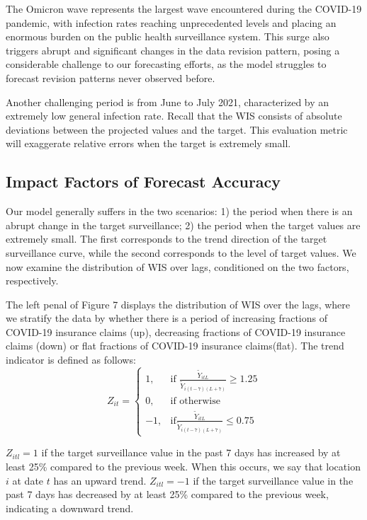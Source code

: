 The Omicron wave represents the largest wave encountered during the COVID-19 pandemic, with infection rates reaching unprecedented levels and placing an enormous burden on the public health surveillance system. This surge also triggers abrupt and significant changes in the data revision pattern, posing a considerable challenge to our forecasting efforts, as the model struggles to forecast revision patterns never observed before.


Another challenging period is from June to July 2021, characterized by an extremely low general infection rate. Recall that the WIS consists of absolute deviations between the projected values and the target. This evaluation metric will exaggerate relative errors when the target is extremely small.


\subsection{Impact Factors of Forecast Accuracy}
Our model generally suffers in the two scenarios: 1) the period when there is an abrupt change in the target surveillance; 2) the period when the target values are extremely small. The first corresponds to the trend direction of the target surveillance curve, while the second corresponds to the level of target values. We now examine the distribution of WIS over lags, conditioned on the two factors, respectively.

The left penal of Figure 7 displays the distribution of WIS over the lags, where we stratify the data by whether there is a period of increasing fractions of COVID-19 insurance claims (up), decreasing fractions of COVID-19 insurance claims (down) or flat fractions of COVID-19 insurance claims(flat). The trend indicator is defined as follows: 
$$
    Z_{it}=
\begin{cases}
    1,           & \text{if } \frac{\widetilde{Y}_{itL}}{\widetilde{Y}_{i(t-7)(L+7)}} \geq 1.25\\
    0, & \text{if otherwise} \\    
    -1, & \text{if} \frac{\widetilde{Y}_{itL}}{\widetilde{Y}_{i(t-7)(L+7)}} \leq 0.75
\end{cases}
$$

$Z_{itl} = 1$ if the target surveillance value in the past 7 days has increased by at least 25\% compared to the previous week. When this occurs, we say that location $i$ at date $t$ has an upward trend. $Z_{itl} = -1$ if the target surveillance value in the past 7 days has decreased by at least 25\% compared to the previous week, indicating a downward trend.


